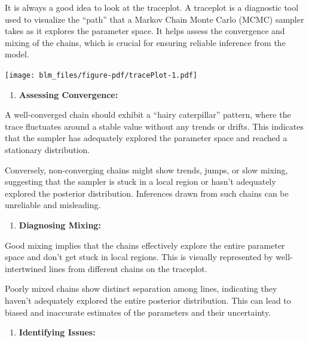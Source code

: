 \documentclass[
  letterpaper,
  DIV=11,
  numbers=noendperiod]{scrreprt}
\newenvironment{Shaded}{\begin{snugshade}}{\end{snugshade}}
\newcommand{\FunctionTok}[1]{\textcolor[rgb]{0.28,0.35,0.67}{#1}}
\newcommand{\NormalTok}[1]{\textcolor[rgb]{0.00,0.23,0.31}{#1}}
\newcommand{\SpecialCharTok}[1]{\textcolor[rgb]{0.37,0.37,0.37}{#1}}
\providecommand{\tightlist}{%
  \setlength{\itemsep}{0pt}\setlength{\parskip}{0pt}}\usepackage{longtable,booktabs,array}
\begin{document}
It is always a good idea to look at the traceplot. A traceplot is a
diagnostic tool used to visualize the ``path'' that a Markov Chain Monte
Carlo (MCMC) sampler takes as it explores the parameter space. It helps
assess the convergence and mixing of the chains, which is crucial for
ensuring reliable inference from the model.

\begin{Shaded}
\end{Shaded}

\texttt{[image: blm\_files/figure-pdf/tracePlot-1.pdf]}

\begin{enumerate}
\def\labelenumi{\arabic{enumi}.}
\tightlist
\item
  \textbf{Assessing Convergence:}
\end{enumerate}

A well-converged chain should exhibit a ``hairy caterpillar'' pattern,
where the trace fluctuates around a stable value without any trends or
drifts. This indicates that the sampler has adequately explored the
parameter space and reached a stationary distribution.

Conversely, non-converging chains might show trends, jumps, or slow
mixing, suggesting that the sampler is stuck in a local region or hasn't
adequately explored the posterior distribution. Inferences drawn from
such chains can be unreliable and misleading.

\begin{enumerate}
\def\labelenumi{\arabic{enumi}.}
\setcounter{enumi}{1}
\tightlist
\item
  \textbf{Diagnosing Mixing:}
\end{enumerate}

Good mixing implies that the chains effectively explore the entire
parameter space and don't get stuck in local regions. This is visually
represented by well-intertwined lines from different chains on the
traceplot.

Poorly mixed chains show distinct separation among lines, indicating
they haven't adequately explored the entire posterior distribution. This
can lead to biased and inaccurate estimates of the parameters and their
uncertainty.

\begin{enumerate}
\def\labelenumi{\arabic{enumi}.}
\setcounter{enumi}{2}
\tightlist
\item
  \textbf{Identifying Issues:}
\end{enumerate}
\end{document}
